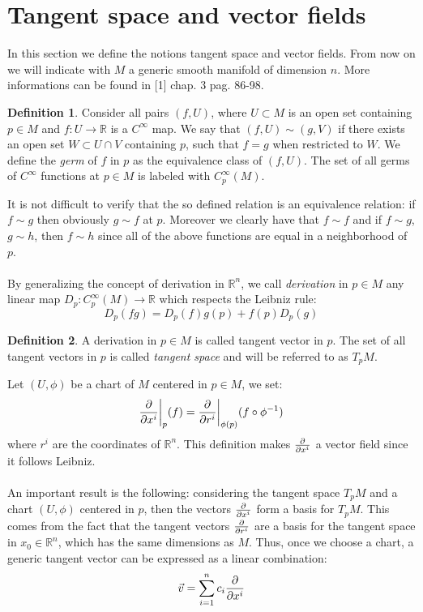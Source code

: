 \documentclass[12pt,a4paper]{report}
\theoremstyle{definition}
\newtheorem{Def}{Definition}[chapter]
\theoremstyle{Theorem}
\theoremstyle{definition}
\theoremstyle{definition}
\begin{document}
	\section{Tangent space and vector fields}
	In this section we define the notions tangent space and vector fields. From now on we will indicate with $M$ a generic smooth manifold of dimension $n$. More informations can be found in [1] chap. 3 pag. 86-98.
	\begin{Def}
		Consider all pairs $(f,U)$, where $U\subset M$ is an open set containing $p\in M$ and $f:U\rightarrow \mathbb{R}$ is a $C^\infty$ map. We say that $(f,U)\sim(g,V)$ if there exists an open set $W\subset U\cap V$ containing $p$, such that $f=g$ when restricted to $W$. We define the \textit{germ} of $f$ in $p$ as the equivalence class of $(f,U)$.
		The set of all germs of $C^\infty$ functions at $p\in M$ is labeled with $C^\infty_p(M)$.
	\end{Def}
	It is not difficult to verify that the so defined relation is an equivalence relation: if $f\sim g$ then obviously $g\sim f$ at $p$. Moreover we clearly have that $f\sim f$ and if $f\sim g$, $g\sim h$, then $f\sim h$ since all of the above functions are equal in a neighborhood of $p$.\\
	\\
	By generalizing the concept of derivation in $\mathbb{R}^n$, we call \textit{derivation} in $p\in M$ any linear map $D_p:C^\infty_p(M)\rightarrow\mathbb{R}$ which respects the Leibniz rule:
	$$D_p(fg)=D_p(f)g(p)+f(p)D_p(g)$$
	\begin{Def}
		A derivation in $p\in M$ is called tangent vector in $p$. The set of all tangent vectors in $p$ is called \textit{tangent space} and will be referred to as $T_pM$.
	\end{Def} 
	Let $(U,\phi)$ be a chart of $M$ centered in $p\in M$, we set:
	$${\partial\over \partial x^i}\bigg\rvert_p(f)={\partial\over \partial r^i}\bigg\rvert_{\phi(p)}(f\circ \phi^{-1})$$ where $r^i$ are the coordinates of $\mathbb{R}^n$. This definition makes ${\partial\over \partial x^i}$ a vector field since it follows Leibniz.\\
	\\
	An important result is the following: considering the tangent space $T_pM$ and a chart $(U,\phi)$ centered in $p$, then the vectors $\partial\over \partial x^i$ form a basis for $T_pM$. This comes from the fact that the tangent vectors $\partial\over \partial r^i$ are a basis for the tangent space in $x_0\in\mathbb{R}^n$, which has the same dimensions as $M$. Thus, once we choose a chart, a generic tangent vector can be expressed as a linear combination: $$\vec{v}=\sum_{i=1}^{n}c_i{\partial\over \partial x^i}$$ 
\end{document}
